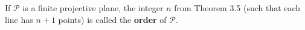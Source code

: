 If $\mathcal{P}$ is a finite projective plane, the integer $n$ from Theorem 3.5 (such that each line has $n + 1$ points) is called the \textbf{order} of $\mathcal{P}$.
